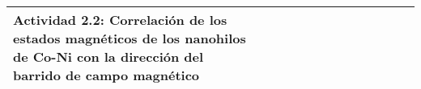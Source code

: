\begin{table}[!hpt]
{\begin{tabular}{|l|llllllllllll|}
            \hline 
            \multicolumn{1}{|p{114.4275pt}}{\raggedright {\bfseries Actividad 2.2:} Correlaci\'on de los estados magn\'eticos de los nanohilos de Co-Ni con la direcci\'on del barrido de campo magn\'etico } & \multicolumn{1}{|p{31.618126pt}}{} & \multicolumn{1}{|p{31.618126pt}}{} & \multicolumn{1}{|p{30.1125pt}}{} & \multicolumn{1}{|p{30.1125pt}}{} & \multicolumn{1}{|p{30.1125pt}}{} & \multicolumn{1}{|p{30.1125pt}}{} & \multicolumn{1}{|p{30.1125pt}}{} & \multicolumn{1}{|p{30.1125pt}}{} & \multicolumn{1}{|p{30.1125pt}}{\centering {\bfseries $\otimes$}} & \multicolumn{1}{|p{30.1125pt}}{\centering {\bfseries $\otimes$}} & \multicolumn{1}{|p{30.1125pt}}{\centering {\bfseries $\otimes$}} & \multicolumn{1}{|p{30.1125pt}|}{\centering {\bfseries $\otimes$}}\\ 
            \hline 
        \end{tabular}
    }
\end{table}